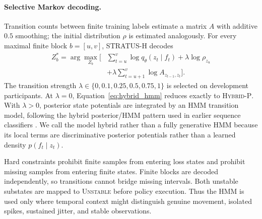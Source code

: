 \documentclass[sigconf,review]{acmart}
\newcommand{\methodHP}{\textsc{Hybrid-P}\xspace}
\newcommand{\methodH}{\textsc{STRATUS-H}\xspace}
\begin{document}
\paragraph{Selective Markov decoding.}
Transition counts between finite training labels estimate a matrix $A$ with additive $0.5$ smoothing; the initial distribution $\rho$ is estimated analogously. For every maximal finite block $b=[u,v]$, \methodH decodes
\begin{equation}
\begin{aligned}
Z_b^*=\arg\max_{Z_b}\Bigg[&
\sum_{t=u}^{v}\log q_\theta(z_t\mid f_t)
+\lambda\log\rho_{z_u}\\
&+\lambda\sum_{t=u+1}^{v}\log A_{z_{t-1},z_t}
\Bigg].
\end{aligned}
\label{eq:hybrid_hmm}
\end{equation}
The transition strength $\lambda\in\{0,0.1,0.25,0.5,0.75,1\}$ is selected on development participants. At $\lambda=0$, Equation~\eqref{eq:hybrid_hmm} reduces exactly to \methodHP. With $\lambda>0$, posterior state potentials are integrated by an HMM transition model, following the hybrid posterior/HMM pattern used in earlier sequence classifiers \cite{smyth1992fault,rigoll1996hybrid}. We call the model hybrid rather than a fully generative HMM because its local terms are discriminative posterior potentials rather than a learned density $p(f_t\mid z_t)$.

Hard constraints prohibit finite samples from entering loss states and prohibit missing samples from entering finite states. Finite blocks are decoded independently, so transitions cannot bridge missing intervals. Both unstable substates are mapped to \textsc{Unstable} before policy execution. Thus the HMM is used only where temporal context might distinguish genuine movement, isolated spikes, sustained jitter, and stable observations.
\end{document}
